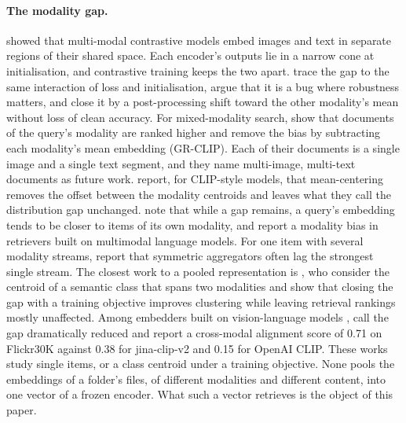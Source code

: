 \documentclass[11pt]{article}
\begin{document}
\paragraph{The modality gap.} \citet{liang2022mindgap} showed that multi-modal contrastive models embed images and text in separate regions of their shared space. Each encoder's outputs lie in a narrow cone at initialisation, and contrastive training keeps the two apart. \citet{chowers2026bugfeature} trace the gap to the same interaction of loss and initialisation, argue that it is a bug where robustness matters, and close it by a post-processing shift toward the other modality's mean without loss of clean accuracy. For mixed-modality search, \citet{li2025grclip} show that documents of the query's modality are ranked higher and remove the bias by subtracting each modality's mean embedding (GR-CLIP). Each of their documents is a single image and a single text segment, and they name multi-image, multi-text documents as future work. \citet{liu2026geometry} report, for CLIP-style models, that mean-centering removes the offset between the modality centroids and leaves what they call the distribution gap unchanged. \citet{role2025fillthegap} note that while a gap remains, a query's embedding tends to be closer to items of its own modality, and \citet{lin2025mmembed} report a modality bias in retrievers built on multimodal language models. For one item with several modality streams, \citet{mehrish2026centroid} report that symmetric aggregators often lag the strongest single stream. The closest work to a pooled representation is \citet{grassucci2026closing}, who consider the centroid of a semantic class that spans two modalities and show that closing the gap with a training objective improves clustering while leaving retrieval rankings mostly unaffected. Among embedders built on vision-language models \citep{gunther2025jinav4,zhang2025gme,lin2025mmembed,jiang2025vlm2vec}, \citet{gunther2025jinav4} call the gap dramatically reduced and report a cross-modal alignment score of 0.71 on Flickr30K against 0.38 for jina-clip-v2 and 0.15 for OpenAI CLIP. These works study single items, or a class centroid under a training objective. None pools the embeddings of a folder's files, of different modalities and different content, into one vector of a frozen encoder. What such a vector retrieves is the object of this paper.
\end{document}

